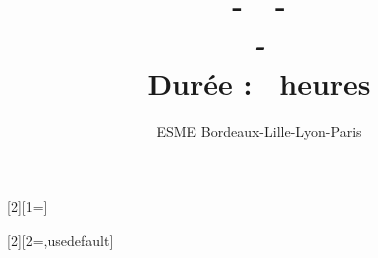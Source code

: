 \usepackage{fancyhdr}
\pagestyle{fancy}
\fancyhf{}
\renewcommand{\headrulewidth}{0pt}
\fancyfoot[LO,RE]{\textbf{\thepage}} 
\fancyfoot[C]{\epreuve~-~\promo~-~\annee~-~\module}

\usepackage{tikz}
\newcommand{\feuilleDR}[1]{%
\begin{tikzpicture}
    \draw[gray!30](0,0)grid[step=0.5cm](\linewidth,#1);
\end{tikzpicture}}%
\usepackage{xargs}
\usepackage{ifthen}

\setcounter{numques}{0}
[2][1=]{
\addtocounter{numques}{1}
\hfill\break\noindent{\normalfont#1\bfseries Q\thenumques.\xspace\normalfont\normalcolor~#2\\[0.2cm]}
}
[2][2=\Large,usedefault]{%
    \setcounter{numques}{0}
    \addtocounter{numexos}{1}
    {\bigskip{}\\[0.2cm]}
    {\bigskip{}\\[0.2cm]}
}%
\title{\textsc{\annee~-~\promo~-~\module}\\
\emph{\epreuve~-~\titreEval}\\ 
Durée : \dureeEval~heures}
\author{ESME Bordeaux-Lille-Lyon-Paris}        
\date{}
